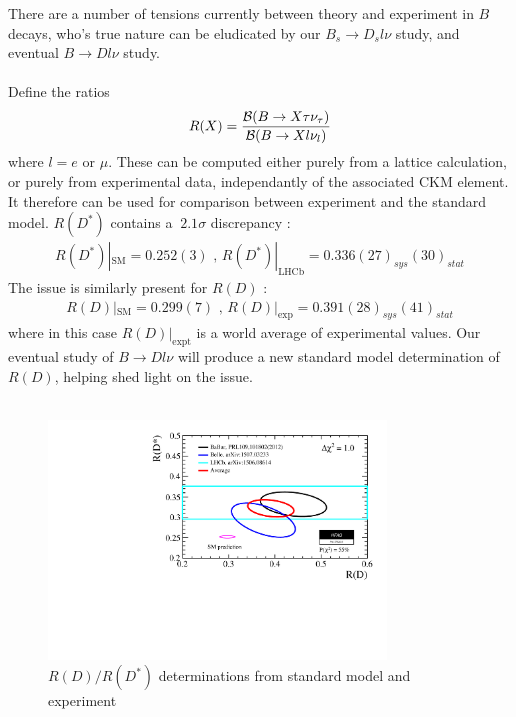 There are a number of tensions currently between theory and experiment in $B$ decays, who's true nature can be eludicated by our $B_s\to D_s l\nu$ study, and eventual $B\to Dl\nu$ study.
\\ \\
Define the ratios
\begin{align}
	R(X) = {\mathcal{B}(B\to X \tau \nu_{\tau}) \over \mathcal{B}(B\to X l \nu_l)}
\end{align}
where $l=e$ or $\mu$. These can be computed either purely from a lattice calculation, or purely from experimental data, independantly of the associated CKM element. It therefore can be used for comparison between experiment and the standard model. $R(D^*)$ contains a $~2.1\sigma$ discrepancy \cite{Aaij:2015yra}:
\begin{align}
	R(D^*)|_{\text{SM}} = 0.252(3) \text{ , } R(D^*)|_{\text{LHCb}} = 0.336(27)_{sys}(30)_{stat}
\end{align}
The issue is similarly present for $R(D)$ \cite{Monahan:2017uby}:
\begin{align}
	R(D)|_{\text{SM}} = 0.299(7) \text{ , } R(D)|_{\text{exp}} = 0.391(28)_{sys}(41)_{stat}
\end{align}
where in this case $R(D)|_{\text{expt}}$ is a world average of experimental values. Our eventual study of $B\to Dl\nu$ will produce a new standard model determination of $R(D)$, helping shed light on the issue.
\\ \\
\begin{figure}
  \begin{center}
    \includegraphics[width=
   0.8\textwidth]{images/rdrds_eps15.pdf}
  \end{center}
  \caption{$R(D)/R(D^*)$ determinations from standard model and experiment \cite{HFAG}}
  \label{fig:semileptonic}
\end{figure}

